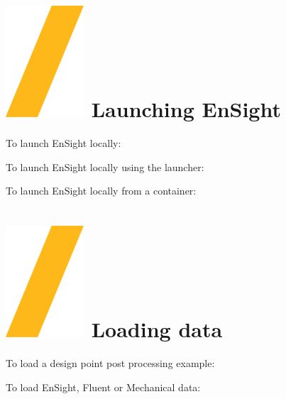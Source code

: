 \documentclass[9pt,landscape]{article}
\begin{document}
\begin{multicols}{3}
\setlength{\premulticols}{0.5pt}
\setlength{\postmulticols}{0.5pt}
\setlength{\multicolsep}{0.5pt}
\setlength{\columnsep}{1pt}


\section{\includegraphics[height=\fontcharht\font`\S]{slash.png} Launching EnSight}


To launch EnSight locally:


To launch EnSight locally using the launcher:

To launch EnSight locally from a container:




\section{\includegraphics[height=\fontcharht\font`\S]{slash.png} Loading data}

To load a design point post processing example:


To load EnSight, Fluent or Mechanical data:


\end{multicols}
\end{document}
